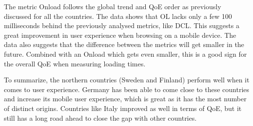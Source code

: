 The metric Onload follows the global trend and QoE order as previously discussed for all the countries. The data shows that OL lacks only a few 100 milliseconds behind the previously analysed metrics, like DCL. This suggests a great improvement in user experience when browsing on a mobile device. The data also suggests that the difference between the metrics will get smaller in the future. Combined with an Onload which gets even smaller, this is a good sign for the overall QoE when measuring loading times. 
  
To summarize, the northern countries (Sweden and Finland) perform well when it comes to user experience. Germany has been able to come close to these countries and increase its mobile user experience, which is great as it has the most number of distinct origins. Countries like Italy improved as well in terms of QoE, but it still has a long road ahead to close the gap with other countries.


\begin{summary}
\end{summary}



